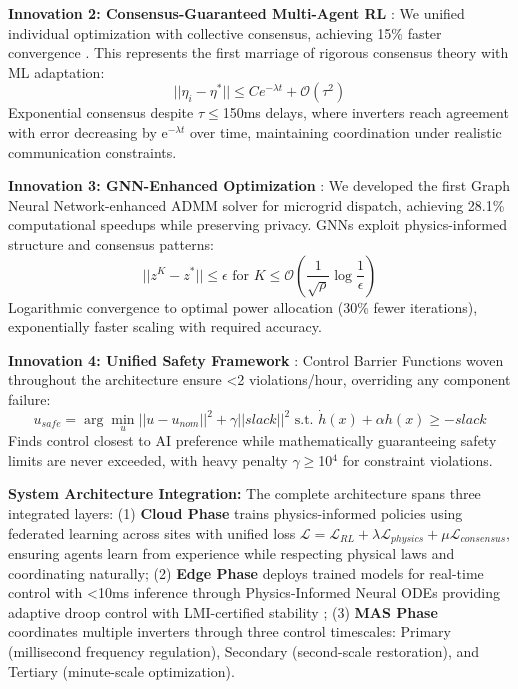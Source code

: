 \documentclass[12pt]{article}
\begin{document}
\textbf{Innovation 2: Consensus-Guaranteed Multi-Agent RL} \cite{our2024theoretical}: We unified individual optimization with collective consensus, achieving 15\% faster convergence \cite{our2024experimental}. This represents the first marriage of rigorous consensus theory with ML adaptation:
$$||\eta_i - \eta^*|| \leq Ce^{-\lambda t} + \mathcal{O}(\tau^2)$$
Exponential consensus despite $\tau\leq$150ms delays, where inverters reach agreement with error decreasing by e$^{-\lambda t}$ over time, maintaining coordination under realistic communication constraints.

\textbf{Innovation 3: GNN-Enhanced Optimization} \cite{our2024theoretical}: We developed the first Graph Neural Network-enhanced ADMM solver for microgrid dispatch, achieving 28.1\% computational speedups \cite{our2024experimental} while preserving privacy. GNNs exploit physics-informed structure and consensus patterns:
$$||z^K - z^*|| \leq \epsilon \text{ for } K \leq \mathcal{O}\left(\frac{1}{\sqrt{\rho}} \log\frac{1}{\epsilon}\right)$$
Logarithmic convergence to optimal power allocation (30\% fewer iterations), exponentially faster scaling with required accuracy.

\textbf{Innovation 4: Unified Safety Framework} \cite{our2024theoretical}: Control Barrier Functions woven throughout the architecture ensure <2 violations/hour, overriding any component failure:
$$u_{safe} = \arg\min_u ||u - u_{nom}||^2 + \gamma||slack||^2 \text{ s.t. } \dot{h}(x) + \alpha h(x) \geq -slack$$
Finds control closest to AI preference while mathematically guaranteeing safety limits are never exceeded, with heavy penalty $\gamma\geq$10$^4$ for constraint violations.

\textbf{System Architecture Integration:} The complete architecture spans three integrated layers: (1) \textbf{Cloud Phase} trains physics-informed policies using federated learning across sites with unified loss $\mathcal{L} = \mathcal{L}_{RL} + \lambda \mathcal{L}_{physics} + \mu \mathcal{L}_{consensus}$, ensuring agents learn from experience while respecting physical laws and coordinating naturally; (2) \textbf{Edge Phase} deploys trained models for real-time control with <10ms inference through Physics-Informed Neural ODEs providing adaptive droop control with LMI-certified stability \cite{our2024theoretical}; (3) \textbf{MAS Phase} coordinates multiple inverters through three control timescales: Primary (millisecond frequency regulation), Secondary (second-scale restoration), and Tertiary (minute-scale optimization).
\end{document}
